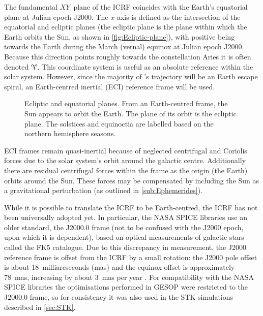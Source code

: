 The fundamental $XY$~plane of the ICRF coincides with the Earth's equatorial plane at Julian epoch J2000. The $x$-axis is defined as the intersection of the equatorial and ecliptic planes (the ecliptic plane is the plane within which the Earth orbits the Sun, as shown in \autoref{fig:Ecliptic-plane}), with positive being towards the Earth during the March (vernal) equinox at Julian epoch J2000. Because this direction points roughly towards the constellation Aries it is often denoted $\Aries$. This coordinate system is useful as an absolute reference within the solar system. However, since the majority of \BW's trajectory will be an Earth escape spiral, an Earth-centred inertial (ECI) reference frame will be used.

\begin{figure}
\centering
\def\svgwidth{\figurewidth}

\caption{Ecliptic and equatorial planes. From an Earth-centred frame, the Sun appears to orbit the Earth. The plane of its orbit is the ecliptic plane. %
The solstices and equinoctia are labelled based on the northern hemisphere seasons.} \label{fig:Ecliptic-plane}
\end{figure}

ECI frames remain quasi-inertial because of neglected centrifugal and Coriolis forces due to the solar system's orbit around the galactic centre. Additionally there are residual centrifugal forces within the frame as the origin (the Earth) orbits around the Sun. These forces may be compensated by including the Sun as a gravitational perturbation (as outlined in \autoref{sub:Ephemerides}).

While it is possible to translate the ICRF to be Earth-centred, the ICRF has not been universally adopted yet. In particular, the NASA SPICE libraries use an older standard, the J2000.0 frame (not to be confused with the J2000 epoch, upon which it is dependent), based on optical measurements of galactic stars called the FK5 catalogue. Due to this discrepancy in measurement, the J2000 reference frame is offset from the ICRF  by a small rotation: the J2000 pole offset is about 18~milliarcseconds (mas) and the equinox offset is approximately 78~mas, increasing by about 3~mas per year \parencite{Gontier2002}. 
For compatibility with the NASA SPICE libraries the optimisations performed in GESOP were restricted to the J2000.0 frame, so for consistency it was also used in the STK simulations described in \autoref{sec:STK}.


